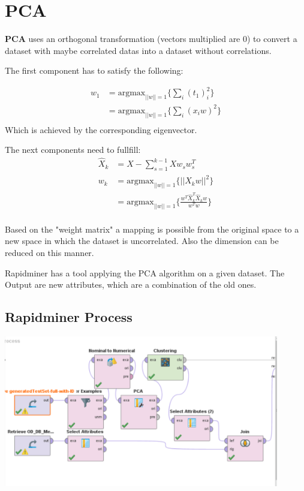 \section{PCA}

\textbf{PCA} uses an orthogonal transformation (vectors multiplied are 0) to
convert a dataset with maybe correlated datas into a dataset without
correlations.

The first component has to satisfy the following:

\begin{align*}
w_1 &= \text{argmax}_{||w|| = 1} \{\sum_i (t_1)_i^2\}\\
	&= \text{argmax}_{||w|| = 1} \{\sum_i (x_iw)^2\}\\
\end{align*}
Which is achieved by the corresponding eigenvector.

The next components need to fullfill:
\begin{align*}
\hat{X}_k &= X - \sum_{s=1}^{k-1} Xw_sw_s^T\\
w_k &= \text{argmax}_{||w|| = 1} \{||\hat{X}_kw||^2\}\\
	&= \text{argmax}_{||w|| = 1} \{\frac{w^T\hat{X}_k^T\hat{X}_kw}{w^Tw}\}\\
\end{align*}

Based on the "weight matrix" a mapping is possible from the original space to a new space in which the dataset is uncorrelated. Also the dimension can be reduced on this manner.


Rapidminer has a tool applying the PCA algorithm on a given dataset. The Output are 
new attributes, which are a combination of the old ones. 

\subsection{Rapidminer Process}
\includegraphics[width=0.9\textwidth]{PCAClustering}

